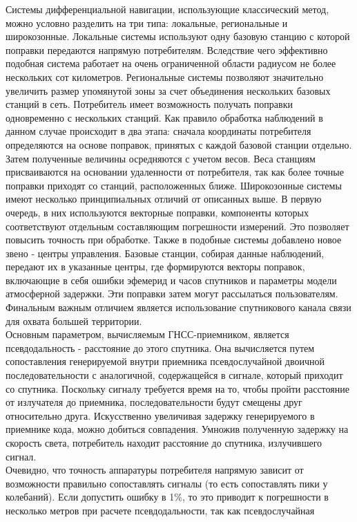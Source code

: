 \documentclass[a4paper,12pt]{report}
\begin{document}
Системы дифференциальной навигации, использующие классический метод, можно условно разделить на три типа: локальные, региональные и 
широкозонные. Локальные системы используют одну базовую станцию с которой поправки передаются напрямую потребителям. Вследствие чего эффективно 
подобная система работает на очень ограниченной области радиусом не более нескольких сот километров. Региональные системы позволяют значительно 
увеличить размер упомянутой зоны за счет объединения нескольких базовых станций в сеть. Потребитель имеет возможность получать поправки 
одновременно с нескольких станций. Как правило обработка наблюдений в данном случае происходит в два этапа: сначала координаты потребителя 
определяются на основе поправок, принятых с каждой базовой станции отдельно. Затем полученные величины осредняются с учетом весов.
Веса станциям присваиваются на основании удаленности от потребителя, так как более точные поправки приходят со станций, расположенных ближе. 
Широкозонные системы имеют несколько принципиальных отличий от описанных выше. В первую очередь, в них используются векторные поправки, 
компоненты которых соответствуют отдельным составляющим погрешности измерений. Это позволяет повысить точность при обработке. Также в подобные 
системы добавлено новое звено - центры управления. Базовые станции, собирая данные наблюдений, передают их в указанные центры, где формируются 
векторы поправок, включающие в себя ошибки эфемерид и часов спутников и параметры модели атмосферной задержки. Эти поправки затем могут 
рассылаться пользователям. Финальным важным отличием является использование спутникового канала связи для охвата большей территории. \\
Основным параметром, вычисляемым ГНСС-приемником, является псевдодальность - расстояние до этого спутника. Она вычисляется путем 
сопоставления генерируемой внутри приемника псевдослучайной двоичной последовательности с аналогичной, содержащейся в сигнале, который 
приходит со спутника. Поскольку сигналу требуется время на то, чтобы пройти расстояние от излучателя до приемника, последовательности будут 
смещены друг относительно друга. Искусственно увеличивая задержку генерируемого в приемнике кода, можно добиться совпадения. Умножив полученную 
задержку на скорость света, потребитель находит расстояние до спутника, излучившего сигнал. \\
Очевидно, что точность аппаратуры потребителя напрямую зависит от возможности правильно сопоставлять сигналы (то есть сопоставлять пики у 
колебаний). Если допустить ошибку в 1\%, то это приводит к погрешности в несколько метров при расчете псевдодальности, так как псевдослучайная 
\end{document}
